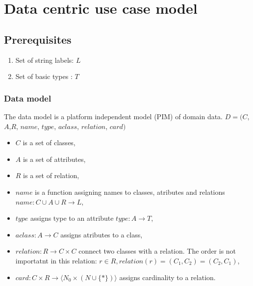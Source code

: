 ﻿\documentclass[10pt,a4paper]{article}
\begin{document}
\section{Data centric use case model}
\subsection{Prerequisites} 
\begin{enumerate}
	\item Set of string labels: $L$ 
	\item Set of basic types : $T$ 
	
\end{enumerate}
\subsubsection{Data model}
The data model is a platform independent model (PIM) of domain data.
$D = ( C$,$ A$,$ R$, $name$, $type$, $aclass$, $relation$, $card)$
\begin{itemize}
	\item $C$ is a set of classes,
	\item $A$ is a set of attributes,
	\item $R$ is a set of relation,
	\item $name$ is a function assigning names to classes, atributes and relations $name: C \cup A \cup R \rightarrow L$,
	\item $type$ assigns type to an attribute $type: A \rightarrow T$,
	\item $aclass: A \rightarrow C$ assigns atributes to a class,
	\item $relation: R \rightarrow C \times C$ connect two classes with a relation. The order is not importatnt in this relation: $r \in R, relation(r)=(C_1, C_2)=(C_2, C_1)$,
	\item $card: C \times R \rightarrow \langle N_0 \times (N \cup \lbrace * \rbrace) \rangle$ assigns cardinality to a relation.
\end{itemize}
\end{document}
